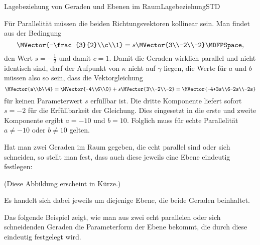 \begin{MXContent}{Lagebeziehung von Geraden und Ebenen im Raum}{Lagebeziehung}{STD}
\begin{MHint}{\iSolution}
Für Parallelität müssen die beiden Richtungsvektoren kollinear sein. Man findet aus der Bedingung
\[
 \MVector{-\frac{3}{2}\\c\\1}=s\MVector{3\\-2\\-2} \MDFPSpace,
\]
den Wert $s=-\frac{1}{2}$ und damit $c=1$. Damit die Geraden wirklich parallel und nicht identisch sind, darf der Aufpunkt von $\kappa$ nicht auf $\gamma$ liegen, die Werte für $a$ und $b$ müssen also so sein, dass die Vektorgleichung
\[
 \MVector{a\\b\\4}=\MVector{-4\\6\\0}+s\MVector{3\\-2\\-2}=\MVector{-4+3s\\6-2s\\-2s}
\]
für keinen Parameterwert $s$ erfüllbar ist. Die dritte Komponente liefert sofort $s=-2$ für die Erfüllbarkeit der Gleichung. Dies eingesetzt in die erste und zweite Komponente ergibt $a=-10$ und $b=10$. Folglich muss für echte Parallelität $a\neq-10$ oder $b\neq10$ gelten.
\end{MHint}

Hat man zwei Geraden im Raum gegeben, die echt parallel sind oder sich schneiden, so stellt man fest, dass auch diese jeweils eine Ebene eindeutig festlegen:

(Diese Abbildung erscheint in Kürze.)

Es handelt sich dabei jeweils um diejenige Ebene, die beide Geraden beinhaltet.

Das folgende Beispiel zeigt, wie man aus zwei echt parallelen oder sich schneidenden Geraden die Parameterform der Ebene bekommt, die durch diese eindeutig festgelegt wird.


\end{MXContent}
